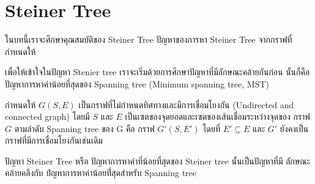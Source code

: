 \chapter{Steiner Tree}

\par{
ในบทนี้เราจะศึกษาคุณสมบัติของ Steiner Tree ปัญหาของการหา
Steiner Tree จากกราฟที่กำหนดให้ 
}

\par{
เพื่อให้เข้าใจในปัญหา Stenier tree เราจะเริ่มด้วยการศึกษาปัญหาที่มีลักษณะคล้ายกันก่อน
นั้นก็คือปัญหาการหาค่าน้อยที่สุดของ Spanning tree (Minimum spanning tree, MST)
}

\par{
กำหนดให้ $G(S, E)$ เป็นกราฟที่ไม่กำหนดทิศทางและมีการเชื่อมโยงกัน (Undirected and
connected graph) โดยมี $S$ และ $E$ เป็นเซตของจุดยอดและเซตของเส้นเชื่อมระหว่างจุดของ
กราฟ $G$ ตามลำดับ Spanning tree ของ G คือ กราฟ $G'(S, E')$ โดยที่ $E' \subseteq E$
และ $G'$ ยังคงเป็น กราฟที่มีการเชื่อมโยงกันเช่นเดิม
}

\par{
ปัญหา Steiner Tree หรือ ปัญหาการหาค่าที่น้อยที่สุดของ Steiner tree นั้นเป็นปัญหาที่มี
ลักษณะคล้ายคลึงกับ ปํญหาการหาค่าน้อยที่่สุดสำหรับ  Spanning tree 
}
